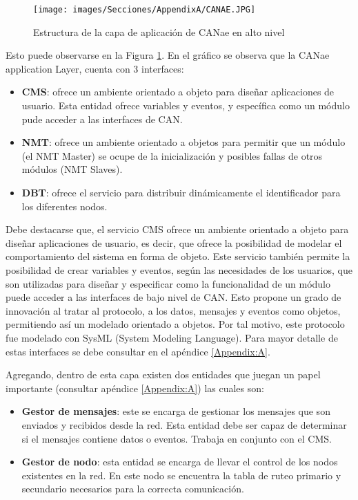 \begin{figure}[h!]
 \centering
 \texttt{[image: images/Secciones/AppendixA/CANAE.JPG]}
  \caption{Estructura de la capa de aplicación de CANae en alto nivel}
\label{fig:CANAEC4}
\end{figure}

Esto puede observarse en la Figura \ref{fig:CANAEC4}. En el gráfico
se observa que la CANae application Layer, cuenta con 3 interfaces:
\begin{itemize}
\item \textbf{CMS}: ofrece un ambiente orientado a objeto para diseñar aplicaciones de usuario.
  Esta entidad ofrece variables y eventos, y específica como un módulo pude acceder a
las interfaces de CAN.
\item \textbf{NMT}: ofrece un ambiente orientado a objetos para permitir que un módulo (el
NMT Master) se ocupe de la inicialización y posibles fallas de otros módulos (NMT Slaves).
\item \textbf{DBT}: ofrece el servicio para distribuir dinámicamente el identificador para los diferentes nodos.
\end{itemize}
Debe destacarse que, el servicio CMS ofrece un ambiente orientado a objeto  para diseñar
aplicaciones de usuario, es decir, que ofrece la posibilidad de modelar el
comportamiento del sistema en forma de objeto. Este servicio también permite la posibilidad
de crear variables y eventos, según las necesidades de los usuarios, que son
utilizadas para diseñar y especificar como la funcionalidad de un módulo puede
acceder a las interfaces de bajo nivel de CAN. Esto propone un grado de innovación
al tratar al protocolo, a los datos, mensajes y eventos como objetos, permitiendo así
un modelado orientado a objetos. Por tal motivo, este protocolo fue modelado
con SysML (System Modeling Language).
Para mayor detalle de estas interfaces se debe consultar en el apéndice \ref{Appendix:A}.

Agregando, dentro de esta capa existen dos entidades que juegan un papel importante
(consultar apéndice \ref{Appendix:A}) las cuales son:
\begin{itemize}
\item \textbf{Gestor de mensajes}: este se encarga de gestionar los mensajes que son enviados y recibidos desde la red.
Esta entidad debe ser capaz de determinar si el mensajes contiene datos o eventos. Trabaja en conjunto
con el CMS.
\item \textbf{Gestor de nodo}: esta entidad se encarga de llevar el control de los nodos existentes en la red. En este
nodo se encuentra la tabla de ruteo primario y secundario necesarios para la correcta comunicación.
\end{itemize}

